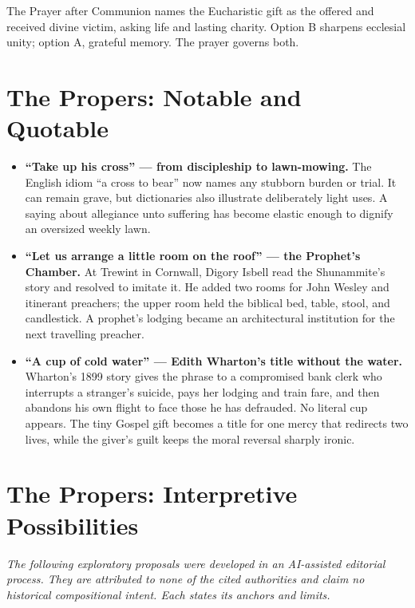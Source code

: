\begin{deepstudy}
The Prayer after Communion names the Eucharistic gift as the offered and received divine victim, asking life and lasting charity. Option B sharpens ecclesial unity; option A, grateful memory. The prayer governs both.

\section*{The Propers: Notable and Quotable}

{\small
\begin{itemize}
\item \textbf{“Take up his cross” --- from discipleship to lawn-mowing.\enspace{}} The English idiom “a cross to bear” now names any stubborn burden or trial. It can remain grave, but dictionaries also illustrate deliberately light uses. A saying about allegiance unto suffering has become elastic enough to dignify an oversized weekly lawn.

\item \textbf{“Let us arrange a little room on the roof” --- the Prophet's Chamber.\enspace{}} At Trewint in Cornwall, Digory Isbell read the Shunammite's story and resolved to imitate it. He added two rooms for John Wesley and itinerant preachers; the upper room held the biblical bed, table, stool, and candlestick. A prophet's lodging became an architectural institution for the next travelling preacher.

\item \textbf{“A cup of cold water” --- Edith Wharton's title without the water.\enspace{}} Wharton's 1899 story gives the phrase to a compromised bank clerk who interrupts a stranger's suicide, pays her lodging and train fare, and then abandons his own flight to face those he has defrauded. No literal cup appears. The tiny Gospel gift becomes a title for one mercy that redirects two lives, while the giver's guilt keeps the moral reversal sharply ironic.
\end{itemize}
}

\section*{The Propers: Interpretive Possibilities}

\noindent\emph{The following exploratory proposals were developed in an AI-assisted editorial process. They are attributed to none of the cited authorities and claim no historical compositional intent. Each states its anchors and limits.}


\end{deepstudy}
